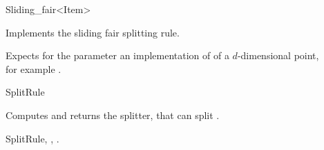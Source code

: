 

\begin{ccRefFunctionObjectClass}{Sliding_fair<Item>}  %


\begin{ccAdvanced}

\ccDefinition
Implements the sliding fair splitting rule.


\ccParameters

Expects for the parameter  an implementation of
of a $d$-dimensional point, \\
for example .

\ccIsModel

SplitRule

\ccTypes


\ccCreation
{}  %



{Computes and returns the splitter, that can split .}

\ccSeeAlso

SplitRule,
,
.

\end{ccAdvanced}

\end{ccRefFunctionObjectClass}




